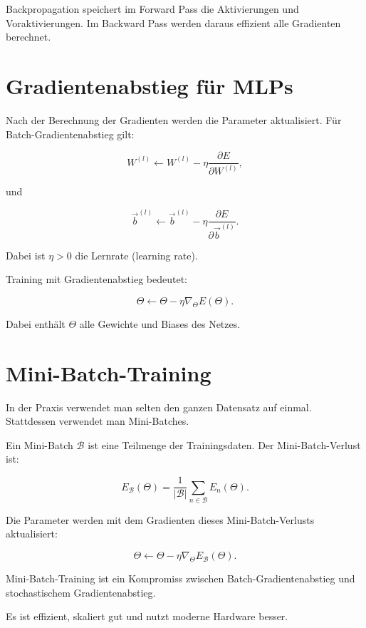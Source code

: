 \begin{conceptbox}
Backpropagation speichert im Forward Pass die Aktivierungen und Voraktivierungen.
Im Backward Pass werden daraus effizient alle Gradienten berechnet.
\end{conceptbox}

\section{Gradientenabstieg für MLPs}

Nach der Berechnung der Gradienten werden die Parameter aktualisiert.
Für Batch-Gradientenabstieg gilt:

\[
    W^{(l)}
    \leftarrow
    W^{(l)}
    -
    \eta
    \frac{\partial E}{\partial W^{(l)}},
\]

und

\[
    \vec{b}^{(l)}
    \leftarrow
    \vec{b}^{(l)}
    -
    \eta
    \frac{\partial E}{\partial \vec{b}^{(l)}}.
\]

Dabei ist \(\eta>0\) die Lernrate (learning rate).

\begin{definitionbox}
Training mit Gradientenabstieg bedeutet:

\[
    \Theta
    \leftarrow
    \Theta
    -
    \eta
    \nabla_{\Theta}E(\Theta).
\]

Dabei enthält \(\Theta\) alle Gewichte und Biases des Netzes.
\end{definitionbox}

\section{Mini-Batch-Training}

In der Praxis verwendet man selten den ganzen Datensatz auf einmal.
Stattdessen verwendet man Mini-Batches.

Ein Mini-Batch \(\mathcal{B}\) ist eine Teilmenge der Trainingsdaten.
Der Mini-Batch-Verlust ist:

\[
    E_{\mathcal{B}}(\Theta)
    =
    \frac{1}{|\mathcal{B}|}
    \sum_{n\in\mathcal{B}}
    E_n(\Theta).
\]

Die Parameter werden mit dem Gradienten dieses Mini-Batch-Verlusts aktualisiert:

\[
    \Theta
    \leftarrow
    \Theta
    -
    \eta
    \nabla_{\Theta}E_{\mathcal{B}}(\Theta).
\]

\begin{conceptbox}
Mini-Batch-Training ist ein Kompromiss zwischen Batch-Gradientenabstieg und stochastischem Gradientenabstieg.

Es ist effizient, skaliert gut und nutzt moderne Hardware besser.
\end{conceptbox}

